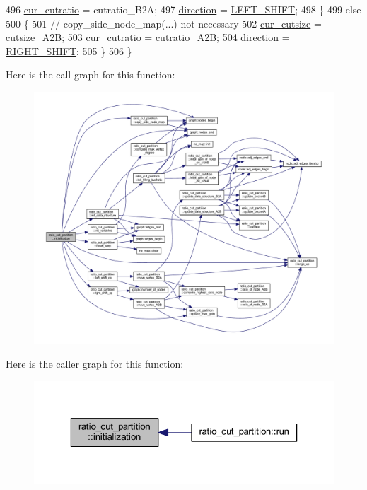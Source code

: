 \begin{DoxyCode}
496     \mbox{\hyperlink{classratio__cut__partition_a9dad324884cef5bcdd50122fc98e0860}{cur\_cutratio}} = cutratio\_B2A;
497     \mbox{\hyperlink{classratio__cut__partition_a11141cdf8705dbb4331315591a3759d6}{direction}} = \mbox{\hyperlink{classratio__cut__partition_a8e2de20fc9f5cbe941aefa1c21c9b5caa286b78408a1c94c92f841b80313428e7}{LEFT\_SHIFT}};
498     \}
499     \textcolor{keywordflow}{else}
500     \{
501     \textcolor{comment}{// copy\_side\_node\_map(...) not necessary}
502     \mbox{\hyperlink{classratio__cut__partition_aa01f2d6257fff28739e2431fe826ef71}{cur\_cutsize}} = cutsize\_A2B;
503     \mbox{\hyperlink{classratio__cut__partition_a9dad324884cef5bcdd50122fc98e0860}{cur\_cutratio}} = cutratio\_A2B;
504     \mbox{\hyperlink{classratio__cut__partition_a11141cdf8705dbb4331315591a3759d6}{direction}} = \mbox{\hyperlink{classratio__cut__partition_a8e2de20fc9f5cbe941aefa1c21c9b5caa94c4c2223116686ce19e42cf4ccbe511}{RIGHT\_SHIFT}};
505     \}
506 \}
\end{DoxyCode}
Here is the call graph for this function\+:\nopagebreak
\begin{figure}[H]
\begin{center}
\leavevmode
\includegraphics[width=350pt]{classratio__cut__partition_af4723810ece28284c79001b9ccf42ca4_cgraph}
\end{center}
\end{figure}
Here is the caller graph for this function\+:\nopagebreak
\begin{figure}[H]
\begin{center}
\leavevmode
\includegraphics[width=323pt]{classratio__cut__partition_af4723810ece28284c79001b9ccf42ca4_icgraph}
\end{center}
\end{figure}
